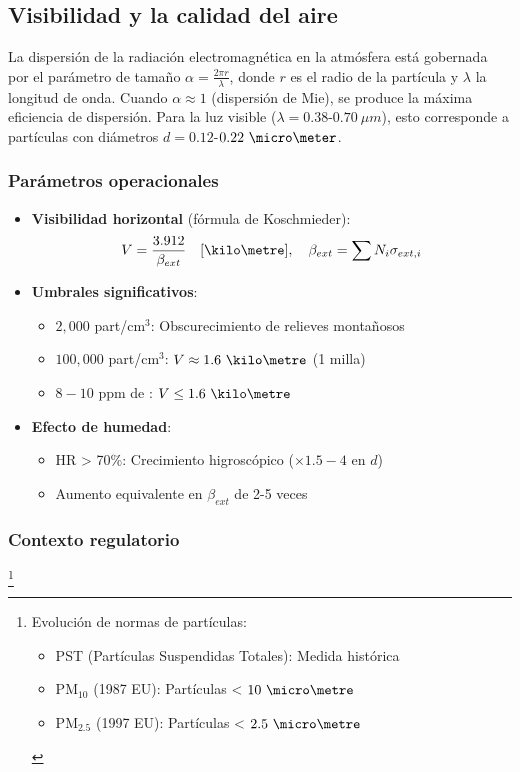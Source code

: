 \subsection{Visibilidad y la calidad del aire}

La dispersión de la radiación electromagnética en la atmósfera está gobernada por el parámetro de tamaño $\alpha = \frac{2\pi r}{\lambda}$, donde $r$ es el radio de la partícula y $\lambda$ la longitud de onda. Cuando $\alpha \approx 1$ (dispersión de Mie), se produce la máxima eficiencia de dispersión. Para la luz visible ($\lambda = 0.38$-$0.70\ \mu m$), esto corresponde a partículas con diámetros $d = 0.12$-$0.22\ \micro\meter$.
\subsubsection{Parámetros operacionales}
\begin{itemize}
    \item \textbf{Visibilidad horizontal} (fórmula de Koschmieder):\label{fKoschmieder}
    \begin{equation}
    V = \frac{3.912}{\beta_{ext}} \quad [\kilo\metre], \quad \beta_{ext} = \sum N_i\sigma_{ext,i}
    \end{equation}
    
    \item \textbf{Umbrales significativos}:
    \begin{itemize}
        \item $2,000$ part/cm$^3$: Obscurecimiento de relieves montañosos
        \item $100,000$ part/cm$^3$: $V \approx 1.6\ \kilo\metre$ (1 milla)
        \item $8-10$ ppm de : $V \leq 1.6\ \kilo\metre$
    \end{itemize}
    
    \item \textbf{Efecto de humedad}:
    \begin{itemize}
        \item HR > 70\%: Crecimiento higroscópico ($\times 1.5-4$ en $d$)
        \item Aumento equivalente en $\beta_{ext}$ de 2-5 veces
    \end{itemize}
\end{itemize}

\subsubsection{Contexto regulatorio}\footnote{
Evolución de normas de partículas:
\begin{itemize}
    \item PST (Partículas Suspendidas Totales): Medida histórica
    \item PM$_{10}$ (1987 EU): Partículas < $10\ \micro\metre$ 
    \item PM$_{2.5}$ (1997 EU): Partículas < $2.5\ \micro\metre$
\end{itemize}
}

